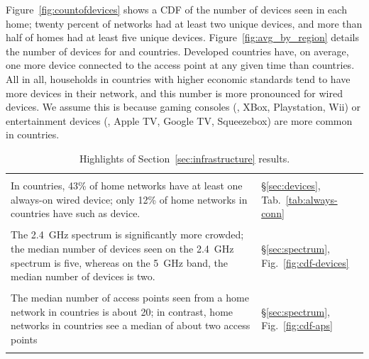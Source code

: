 Figure~\ref{fig:countofdevices} shows a CDF of the number of devices
seen in each home; twenty percent of networks had at least
two unique devices, and more than half of homes had at least five
unique devices.
Figure~\ref{fig:avg_by_region} details the number of devices for
\developed{} and \developing{} countries. 
Developed countries have, on average, one more device connected to
the access point at any given time than \developing{} countries.
All in all, households in countries with higher economic standards tend
to have more devices in their network, and this number is more pronounced for
wired devices. We assume this is because gaming consoles (\eg, XBox,
Playstation, Wii) or entertainment devices (\eg, Apple TV, Google TV,
Squeezebox) are more common in \developed{} countries.

\begin{table}[t!]
\begin{small}
\begin{tabular}{|p{2.6in}l|}
\hline
& \\
In \developed{} countries, 43\% of home networks have at least one
always-on wired device; only 12\% of home networks in \developing{}
countries have such as device. & \S\ref{sec:devices},
Tab.~\ref{tab:always-conn} \\ & \\ 
%
The 2.4~GHz spectrum is significantly more crowded; the median number of
devices seen on the 2.4~GHz spectrum is five, whereas on the 5~GHz band,
the median number of devices is two. & \S\ref{sec:spectrum},
Fig.~\ref{fig:cdf-devices} \\ & \\ 
%
The median number of access points seen from a home network in
\developed{} countries is about 20; in contrast, home networks in
\developing{} countries see a median of about two access points &
\S\ref{sec:spectrum}, Fig.~\ref{fig:cdf-aps} \\ & \\ 
\hline
\end{tabular}
\end{small}
\caption{Highlights of Section~\ref{sec:infrastructure} results.}
\label{tab:infrastructure-results}
\end{table}


